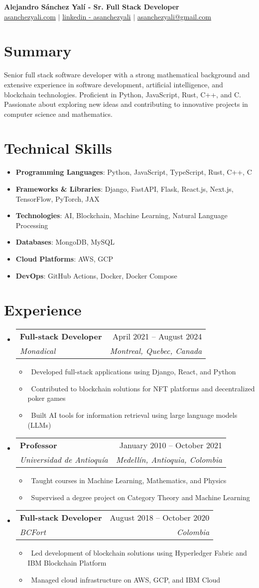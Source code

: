 \documentclass[letterpaper,10pt]{article}
\makeatletter
\newcommand{\resumeItem}[1]{\item\small{#1}}
\newcommand{\resumeSubheading}[4]{
\vspace{-1pt}\item
  \begin{tabular*}{0.97\textwidth}[t]{l@{\extracolsep{\fill}}r}
    \textbf{#1} & #2 \\
    \textit{#3} & \textit{#4} \\
  \end{tabular*}\vspace{-7pt}
}
\newcommand{\resumeSubHeadingList}{\begin{itemize}[leftmargin=0.15in, label={}]}
\newcommand{\resumeSubHeadingListEnd}{\end{itemize}}
\makeatother
\begin{document}
\begin{center}
  \textbf{\huge Alejandro Sánchez Yalí - Sr. Full Stack Developer} \\
  \href{https://asanchezyali.com}{asanchezyali.com} $|$ 
  \href{https://www.linkedin.com/in/asanchezyali}{linkedin - asanchezyali} $|$
  \small \href{mailto:asanchezyali@gmail.com}{asanchezyali@gmail.com} 
\end{center}

\section*{Summary}
Senior full stack software developer with a strong mathematical background and extensive experience in software development, artificial intelligence, and blockchain technologies. Proficient in Python, JavaScript, Rust, C++, and C. Passionate about exploring new ideas and contributing to innovative projects in computer science and mathematics.

\section{Technical Skills}
\resumeSubHeadingList
  \resumeItem{\textbf{Programming Languages}: Python, JavaScript, TypeScript, Rust, C++, C}
  \resumeItem{\textbf{Frameworks \& Libraries}: Django, FastAPI, Flask, React.js, Next.js, TensorFlow, PyTorch, JAX}
  \resumeItem{\textbf{Technologies}: AI, Blockchain, Machine Learning, Natural Language Processing}
  \resumeItem{\textbf{Databases}: MongoDB, MySQL}
  \resumeItem{\textbf{Cloud Platforms}: AWS, GCP}
  \resumeItem{\textbf{DevOps}: GitHub Actions, Docker, Docker Compose}
\resumeSubHeadingListEnd

\section{Experience}
\resumeSubHeadingList
  \resumeSubheading
      {Full-stack Developer}{April 2021 -- August 2024}
      {Monadical}{Montreal, Quebec, Canada}
      \resumeSubHeadingList
          \resumeItem{\textbullet\ Developed full-stack applications using Django, React, and Python}
          \resumeItem{\textbullet\ Contributed to blockchain solutions for NFT platforms and decentralized poker games}
          \resumeItem{\textbullet\ Built AI tools for information retrieval using large language models (LLMs)}
      \resumeSubHeadingListEnd
  \resumeSubheading
      {Professor}{January 2010 -- October 2021}
      {Universidad de Antioquía}{Medellín, Antioquia, Colombia}
      \resumeSubHeadingList
          \resumeItem{\textbullet\ Taught courses in Machine Learning, Mathematics, and Physics}
          \resumeItem{\textbullet\ Supervised a degree project on Category Theory and Machine Learning}
      \resumeSubHeadingListEnd
  \resumeSubheading
      {Full-stack Developer}{August 2018 -- October 2020}
      {BCFort}{Colombia}
      \resumeSubHeadingList
          \resumeItem{\textbullet\ Led development of blockchain solutions using Hyperledger Fabric and IBM Blockchain Platform}
          \resumeItem{\textbullet\ Managed cloud infrastructure on AWS, GCP, and IBM Cloud}
      \resumeSubHeadingListEnd
\resumeSubHeadingListEnd
\end{document}
